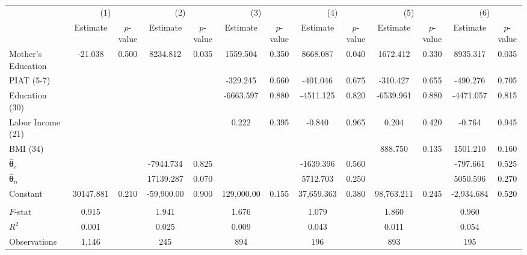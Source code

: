\begin{tabular}{lcccccccccccc} \toprule
 & \multicolumn{2}{c}{(1)}  &  \multicolumn{2}{c}{(2)}  &  \multicolumn{2}{c}{(3)}  &  \multicolumn{2}{c}{(4)}  & \multicolumn{2}{c}{(5)} & \multicolumn{2}{c}{(6)} \\  
 & Estimate & $p$-value & Estimate & $p$-value & Estimate & $p$-value & Estimate & $p$-value & Estimate & $p$-value & Estimate & $p$-value \\ \midrule
Mother's Education &   -21.038 &     0.500 &  8234.812 &     0.035 &  1559.504 &     0.350 &  8668.087 &     0.040 &  1672.412 &     0.330 &  8935.317 &     0.035 \\  
PIAT (5-7) &         &         &         &         &  -329.245 &     0.660 &  -401.046 &     0.675 &  -310.427 &     0.655 &  -490.276 &     0.705 \\  
Education (30)&         &         &         &         & -6663.597 &     0.880 & -4511.125 &     0.820 & -6539.961 &     0.880 & -4471.057 &     0.815 \\  
Labor Income (21) &         &         &         &         &     0.222 &     0.395 &    -0.840 &     0.965 &     0.204 &     0.420 &    -0.764 &     0.945 \\  
BMI (34) &         &         &         &         &         &         &         &         &   888.750 &     0.135 &  1501.210 &     0.160 \\  
$\hat{\bm{\theta}}_c$ &         &         & -7944.734 &     0.825 &         &         & -1639.396 &     0.560 &         &         &  -797.661 &     0.525 \\  
$\hat{\bm{\theta}}_n$  &         &         & 17139.287 &     0.070 &         &         &  5712.703 &     0.250 &         &         &  5050.596 &     0.270 \\  
Constant & 30147.881 &     0.210 & -59,900.00 &     0.900 &  129,000.00 &     0.155 & 37,659.363 &     0.380 & 98,763.211 &     0.245 & -2,934.684 &     0.520 \\  \\ \midrule
$F$-stat &     0.915 &  &     1.941 &    &     1.676 &      &     1.079 &   &     1.860 &     &     0.960 &      \\  
$R^2$ &     0.001 &     &     0.025 &      &     0.009 &    &     0.043 &     &     0.011 &     &     0.054 &   \\  
Observations &  1,146 &     &   245 &     &   894 &     &   196 &    &   893&     &   195 &    \\  
\bottomrule \end{tabular}
